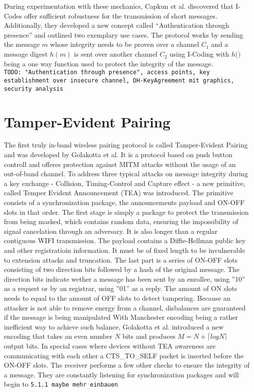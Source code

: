 \documentclass[conference]{IEEEtran}
\begin{document}
During experimentation with these mechanics, Capkun et al. discovered that I-Codes offer sufficient robustness for the transmission of short messages. Additionally, they developed a new concept called ``Authentication through presence'' and outlined two exemplary use cases. The protocol works by sending the message $m$ whose integrity needs to be proven over a channel $C_1$ and a message digest $h(m)$ is sent over another channel $C_2$ using I-Coding with $h(\dot)$ being a one way function used to protect the integrity of the  message. \\

\texttt{TODO: "Authentication through presence", access points, key establishment over insecure channel, DH-KeyAgreement mit graphics, security analysis}

\section{Tamper-Evident Pairing}

The first truly in-band wireless pairing protocol is called Tamper-Evident Pairing and was developed by Golakotta et al.
It is a protocol based on push button controll and offeres protection against MITM attacks without the usage of an out-of-band channel. To address three typical attacks on message integrity during a key exchange - Collision, Timing-Control and Capture effect - a new primitive, called Temper Evident Announcement (TEA) was introduced. The primitive consists of a synchronization package, the announcements payload and ON-OFF slots in that order. The first stage is simply a package to protect the transmission from being masked, which contains random data, ensuring the impossibility of signal cancelation through an adversary. It is also longer than a regular contiguous WIFI transmission. The payload contains a Diffie-Hellman public key and other registratioin information. It must be of fixed length to be invulnerable to extension attacks and truncation. The last part is a series of ON-OFF slots consisting of two direction bits followed by a hash of the original message. The direction bits indicate wether a message has been sent by an enrollee, using ''10'' as a request or by an registrar, using ''01'' as a reply. The amount of ON slots needs to equal to the amount of OFF slots to detect tampering. Because an attacker is not able to remove energy from a channel, disbalances are guaranteed if the message is being manipulated With Manchester encoding being a rather inefficient way to achieve such balance, Golakotta et al. introduced a new encoding that takes an even number $N$ bits and produces $M = N + \lceil logN \rceil$ output bits. In special cases where devices without TEA awareness are communicating with each other a CTS\_TO\_SELF packet is inserted before the ON-OFF slots.
The receiver performs a few other checks to ensure the integrity of a message. They are constantly listening for synchronization packages and will begin to \texttt{5.1.1 maybe mehr einbauen}
\end{document}
